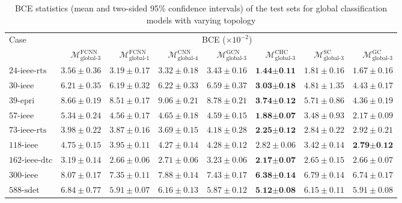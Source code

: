 \documentclass[journal]{IEEEtran}
\begin{document}
\begin{table*}[!ht]
\small
\caption{BCE statistics (mean and two-sided 95\% confidence intervals) of the test sets for global classification models with varying topology}
\label{tab:error_clf_global_contingency}
\def\na{---}
\centering
    \begin{tabular}{lr|rrrrrr}
    \toprule
    \multirow{2}{*}{Case} & \multicolumn{7}{c}{BCE ($\times 10^{-2}$)} \\
    \cmidrule(r){2-8}
    & $\mathcal{M}^{\textrm{FCNN}}_{\textrm{global-3}}$ & $\mathcal{M}^{\textrm{FCNN}}_{\textrm{global-1}}$ & $\mathcal{M}^{\textrm{CNN}}_{\textrm{global-4}}$ & $\mathcal{M}^{\textrm{GCN}}_{\textrm{global-3}}$ & $\mathcal{M}^{\textrm{CHC}}_{\textrm{global-3}}$ & $\mathcal{M}^{\textrm{SC}}_{\textrm{global-3}}$ & $\mathcal{M}^{\textrm{GC}}_{\textrm{global-3}}$ \\
    \midrule
    $\textrm{24-ieee-rts}$ & $3.56 \pm 0.36$ & $3.19 \pm 0.17$ & $3.32 \pm 0.18$ & $3.43 \pm 0.16$ & $\textbf{1.44} \boldsymbol{\pm} \textbf{0.11}$ & $1.81 \pm 0.16$ & $1.67 \pm 0.16$ \\
    $\textrm{30-ieee}$ & $6.21 \pm 0.35$ & $6.19 \pm 0.32$ & $6.22 \pm 0.33$ & $6.59 \pm 0.37$ & $\textbf{3.03} \boldsymbol{\pm} \textbf{0.18}$ & $4.81 \pm 1.35$ & $4.43 \pm 0.17$ \\
    $\textrm{39-epri}$ & $8.66 \pm 0.19$ & $8.51 \pm 0.17$ & $9.06 \pm 0.21$ & $8.78 \pm 0.21$ & $\textbf{3.74} \boldsymbol{\pm} \textbf{0.12}$ & $5.71 \pm 0.86$ & $4.36 \pm 0.19$ \\
    $\textrm{57-ieee}$ & $5.34 \pm 0.24$ & $4.56 \pm 0.17$ & $4.65 \pm 0.18$ & $4.59 \pm 0.15$ & $\textbf{1.88} \boldsymbol{\pm} \textbf{0.07}$ & $3.48 \pm 0.93$ & $2.17 \pm 0.09$ \\
    $\textrm{73-ieee-rts}$ & $3.98 \pm 0.22$ & $3.87 \pm 0.16$ & $3.69 \pm 0.15$ & $4.18 \pm 0.28$ & $\textbf{2.25} \boldsymbol{\pm} \textbf{0.12}$ & $2.84 \pm 0.22$ & $2.92 \pm 0.21$ \\
    $\textrm{118-ieee}$ & $4.75 \pm 0.15$ & $3.95 \pm 0.11$ & $4.27 \pm 0.14$ & $4.28 \pm 0.12$ & $2.82 \pm 0.06$ & $3.42 \pm 0.14$ & $\textbf{2.79} \boldsymbol{\pm} \textbf{0.12}$ \\
    $\textrm{162-ieee-dtc}$ & $3.19 \pm 0.14$ & $2.66 \pm 0.06$ & $2.71 \pm 0.06$ & $3.23 \pm 0.06$ & $\textbf{2.17} \boldsymbol{\pm} \textbf{0.07}$ & $2.65 \pm 0.15$ & $2.66 \pm 0.07$ \\
    $\textrm{300-ieee}$ & $8.07 \pm 0.17$ & $7.35 \pm 0.11$ & $7.88 \pm 0.14$ & $7.43 \pm 0.17$ & $\textbf{6.38} \boldsymbol{\pm} \textbf{0.14}$ & $6.79 \pm 0.14$ & $6.74 \pm 0.17$ \\
    $\textrm{588-sdet}$ & $6.84 \pm 0.77$ & $5.91 \pm 0.07$ & $6.16 \pm 0.13$ & $5.87 \pm 0.12$ & $\textbf{5.12} \boldsymbol{\pm} \textbf{0.08}$ & $6.15 \pm 0.11$ & $5.91 \pm 0.08$ \\
    \bottomrule
    \end{tabular}
\end{table*}
\end{document}
